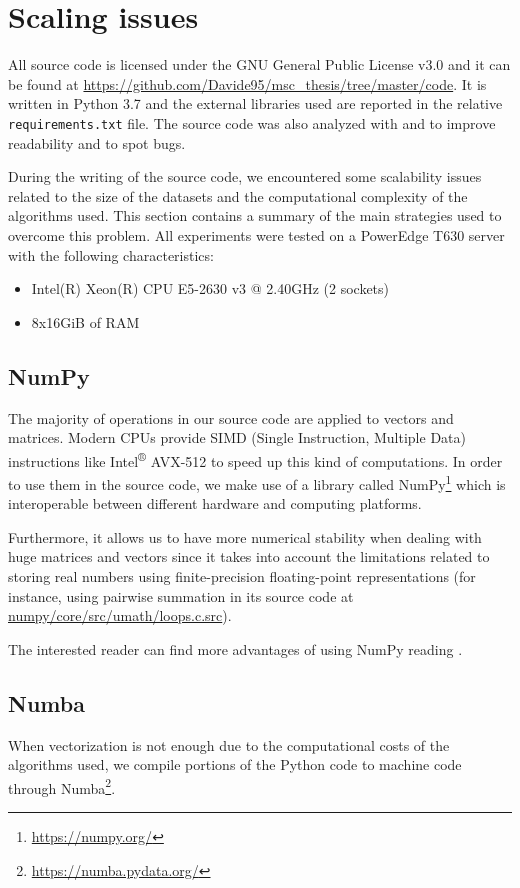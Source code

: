 \section{Scaling issues} \label{scaling}

All source code is licensed under the GNU General Public License v3.0 and it can be found at \url{https://github.com/Davide95/msc_thesis/tree/master/code}.
It is written in Python 3.7 and the external libraries used are reported in the relative \texttt{requirements.txt} file.
The source code was also analyzed with  and  to improve readability and to spot bugs.

During the writing of the source code, we encountered some scalability issues related to
the size of the datasets and the computational complexity of the algorithms used.
This section contains a summary of the main strategies used to overcome this
problem. All experiments were tested on a PowerEdge T630 server with the following characteristics:
\begin{itemize}
    \item Intel(R) Xeon(R) CPU E5-2630 v3 @ 2.40GHz (2 sockets)
    \item 8x16GiB of RAM
\end{itemize}

\subsection{NumPy}
The majority of operations in our source code are applied to vectors and matrices.
Modern CPUs provide SIMD (Single Instruction, Multiple Data) instructions like
Intel\textsuperscript{®} AVX-512 to speed up this kind of computations.
In order to use them in the source code, we make use of a library called NumPy\footnote{\url{https://numpy.org/}}
which is interoperable between different hardware and computing platforms.

Furthermore, it allows us to have more numerical stability when dealing with huge
matrices and vectors since it takes into account the limitations
related to storing real numbers using finite-precision floating-point representations
(for instance, using pairwise summation in its source code at
\href{https://github.com/numpy/numpy/blob/v1.18.1/numpy/core/src/umath/loops.c.src}{numpy/core/src/umath/loops.c.src}).

The interested reader can find more advantages of using NumPy reading \cite{5725236}.

\subsection{Numba}
When vectorization is not enough due to the computational costs of the algorithms used, we
compile portions of the Python code to machine code through Numba\footnote{\url{https://numba.pydata.org/}}.

